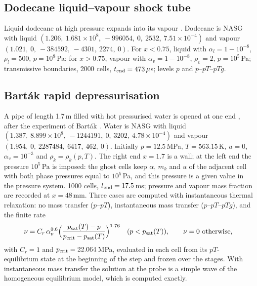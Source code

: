 \documentclass[a4paper,fleqn]{cas-sc}
\begin{document}
\subsection{Dodecane liquid--vapour shock tube}
\label{sec:res_dodecane}
Liquid dodecane at high pressure expands into its vapour \cite[Sec.~8.2.2]{Pelanti2022}.
Dodecane is NASG with liquid $(1.206,\allowbreak\ 1.681\times10^8,\allowbreak\ -996054,\allowbreak\ 0,\allowbreak\ 2532,\allowbreak\ 7.51\times10^{-4})$ and vapour
$(1.021,\ 0,\ -384592,\ -4301,\ 2274,\ 0)$. For $x<0.75$, liquid with $\alpha_l=1-10^{-8}$, $\rho_l=500$, $p=10^8$\,Pa; for $x>0.75$,
vapour with $\alpha_v=1-10^{-8}$, $\rho_v=2$, $p=10^5$\,Pa; transmissive boundaries, 2000 cells, $t_{\rm end}=473\,\mu$s; levels $p$
and $p$--$pT$--$pTg$.

\subsection{Bart\'ak rapid depressurisation}
\label{sec:res_bartak}
A pipe of length 1.7\,m filled with hot pressurised water is opened at one end \cite[Sec.~8.2.4]{Pelanti2022}, after the experiment of Bart\'ak \cite{Bartak1990}. Water is
NASG with liquid $(1.387,\ 8.899\times10^8,\ -1244191,\ 0,\ 3202,\ 4.78\times10^{-4})$ and vapour $(1.954,\ 0,\ 2287484,\ 6417,\ 462,\ 0)$.
Initially $p=12.5$\,MPa, $T=563.15$\,K, $u=0$, $\alpha_v=10^{-3}$ and $\rho_k=\rho_k(p,T)$. The right end $x=1.7$ is a wall; at the
left end the pressure $10^5$\,Pa is imposed: the ghost cells keep $\alpha$, $m_k$ and $u$ of the adjacent cell with both
phase pressures equal to $10^5$\,Pa, and this pressure is a given value in the pressure system. 1000 cells,
$t_{\rm end}=17.5$\,ms; pressure and vapour mass fraction are recorded at $x=48$\,mm. Three cases are computed with
instantaneous thermal relaxation: no mass transfer ($p$--$pT$), instantaneous mass transfer ($p$--$pT$--$pTg$), and the
finite rate
\begin{equation}
\nu=C_r\,\alpha_v^{0.6}\Big(\frac{p_{\rm sat}(T)-p}{p_{\rm crit}-p_{\rm sat}(T)}\Big)^{1.76}\quad(p<p_{\rm sat}(T)),\qquad \nu=0\ \text{otherwise},
\label{eq:bartak_nu}
\end{equation}
with $C_r=1$ and $p_{\rm crit}=22.064$\,MPa, evaluated in each cell from its $pT$-equilibrium state at the beginning of the
step and frozen over the stages. With instantaneous mass transfer the solution at the probe is a simple wave of the
homogeneous equilibrium model, which is computed exactly.
\end{document}
